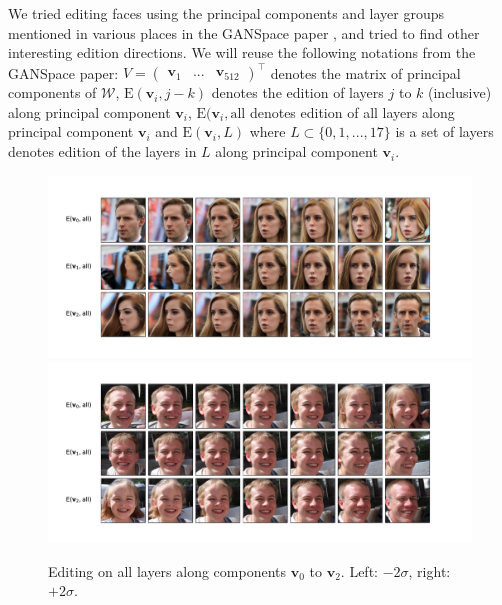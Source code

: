 \documentclass[a4paper]{article}
\begin{document}
We tried editing faces using the principal components and layer groups mentioned in various places in the GANSpace paper \cite{harkonen2020ganspace}, and tried to find other interesting edition directions. We will reuse the following notations from the GANSpace paper: $V = \begin{pmatrix} \mathbf{v}_1 & ... & \mathbf{v}_{512} \end{pmatrix}^\top$ denotes the matrix of principal components of $\mathcal{W}$, $\mathrm{E}(\mathbf{v}_i, j-k)$ denotes the edition of layers $j$ to $k$ (inclusive) along principal component $\mathbf{v}_i$, $\mathrm{E}(\mathbf{v}_i, \mathrm{all}$ denotes edition of all layers along principal component $\mathbf{v}_i$ and $\mathrm{E}(\mathbf{v}_i, L)$ where $L \subset \{0, 1, ..., 17\}$ is a set of layers denotes edition of the layers in $L$ along principal component $\mathbf{v}_i$.

\begin{figure}[hbt!]
    \centering
    \includegraphics[width=\textwidth,trim={1.5cm 1cm 3cm 1cm},clip]{fig/all_components_1.pdf} \\
    \includegraphics[width=\textwidth,trim={1.5cm 1cm 3cm 1cm},clip]{fig/all_components_2.pdf}
    \caption{Editing on all layers along components $\mathbf{v}_0$ to $\mathbf{v}_2$. Left: $-2\sigma$, right: $+2\sigma$.}
    \label{fig:all_components}
\end{figure}
\end{document}
